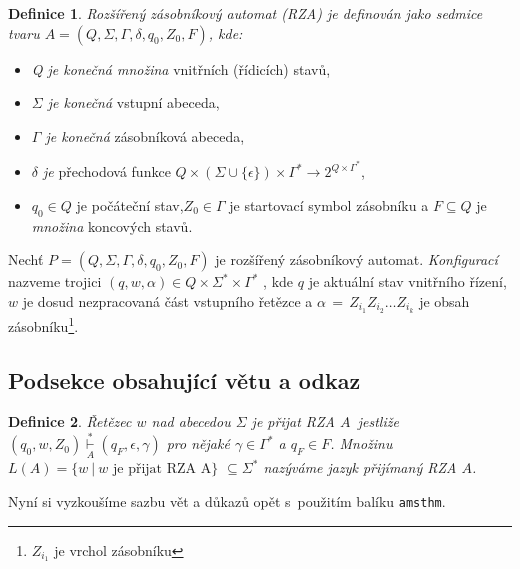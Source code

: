 \documentclass[11pt, twocolumn]{article}
\newtheorem{definition}{Definice}
\begin{document}
\begin{definition}
\label{Definice 1} Rozšířený zásobníkový automat (RZA) je de\-finován jako sedmice tvaru $A = (Q,\Sigma,\Gamma,\delta,q_0,Z_0,F)$,
kde:
\end{definition}
\begin{itemize}
    \item \emph{Q je konečná množina} vnitřních (řídicích) stavů,
    
    \item \emph{$\Sigma$ je konečná} vstupní abeceda, 
    
    \item \emph{$\Gamma$ je konečná} zásobníková abeceda,
    
    \item \emph{$\delta$ je} přechodová funkce $Q\times(\Sigma\cup\{\epsilon\})\times\Gamma^* \rightarrow 2^{Q\times\Gamma^*}$,
    
    \item $q_0 \in Q$ je počáteční stav,$Z_0 \in \Gamma$ je startovací symbol
    zásobníku a $F \subseteq Q$ je \emph{množina} koncových stavů.

\end{itemize}

Nechť $P = (Q, \Sigma, \Gamma, \delta, q_0, Z_0, F)$ je rozšířený zásob\-níkový automat. \emph{Konfigurací} nazveme trojici $(q, w, \alpha) \in
Q \times \Sigma^* \times \Gamma^*$
, kde $q$ je aktuální stav vnitřního řízení,
\begin{math}w\end{math} je dosud nezpracovaná část vstupního řetězce a $\alpha\,=\,Z_{i_1} Z_{i_2} \ldots Z_{i_k}$ je obsah zásobníku\footnote{$Z_{i_1}$ je vrchol zásobníku}.

\subsection{Podsekce obsahující větu a odkaz}

\begin{definition}
 \label{Definice 2} \emph{Řetězec $w$ nad abecedou $\Sigma$ je přijat RZA} $A$~jestliže $(q_0, w, Z_0) \underset{A}{\overset{*}{\vdash}} (q_F , \epsilon, \gamma)$ pro nějaké $\gamma \in \Gamma^*$ a $q_F \in F$. Množinu $L(A) = \{w~|~w \mbox{ je přijat RZA A}\}$ $\subseteq \Sigma^*$ nazýváme \emph{jazyk přijímaný RZA $A$.}
\end{definition}
Nyní si vyzkoušíme sazbu vět a důkazů opět s~použitím
balíku \verb|amsthm|.
\end{document}
